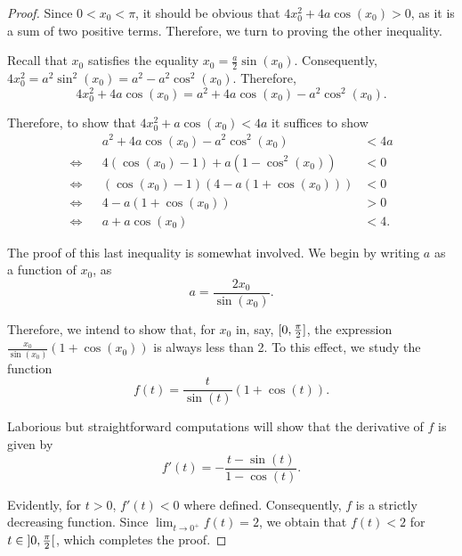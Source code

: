 \begin{proof}
Since $0 < x_0 < \pi$, it should be obvious that $4 x_0^2 + 4 a \cos(x_0) > 0$, as it is a sum of two positive terms. Therefore, we turn to proving the other inequality.

Recall that $x_0$ satisfies the equality $x_0 = \frac a 2 \sin(x_0)$. Consequently, $4 x_0^2 = a^2 \sin^2 (x_0) = a^2 - a^2 \cos^2(x_0)$. Therefore,
\begin{equation}
4 x_0^2 + 4 a \cos(x_0) = a^2 + 4 a \cos(x_0) - a^2 \cos^2(x_0).
\end{equation}

Therefore, to show that $4 x_0^2 + a \cos(x_0) < 4a$ it suffices to show
\begin{equation}
\begin{aligned}
&& a^2 + 4 a \cos(x_0) - a^2 \cos^2(x_0) &< 4a\\
\iff&& 4 (\cos(x_0)-1) + a(1 - \cos^2(x_0)) &< 0\\
\iff&& (\cos(x_0) - 1)(4 - a(1 + \cos(x_0))) &< 0\\
\iff&& 4 - a(1+ \cos(x_0)) &> 0\\
\iff&& a + a \cos(x_0) &< 4.
\end{aligned}
\end{equation}

The proof of this last inequality is somewhat involved. We begin by writing $a$ as a function of $x_0$, as
\begin{equation}
a = \frac{2 x_0}{\sin(x_0)}.
\end{equation}

Therefore, we intend to show that, for $x_0$ in, say, $\interval 0 {\frac \pi 2}$, the expression $\frac{x_0}{\sin(x_0)}(1 + \cos(x_0))$ is always less than 2. To this effect, we study the function
\begin{equation}
f(t) = \frac{t}{\sin(t)}(1 + \cos(t)).
\end{equation}

Laborious but straightforward computations will show that the derivative of $f$ is given by
\begin{equation}
f'(t) = - \frac{t - \sin(t)}{1 - \cos(t)}.
\end{equation}

Evidently, for $t > 0$, $f'(t) < 0$ where defined. Consequently, $f$ is a strictly decreasing function. Since $\lim_{t \to 0^+} f(t) = 2$, we obtain that $f(t) < 2$ for $t \in \ointerval 0 {\frac \pi 2}$, which completes the proof.
\end{proof}

